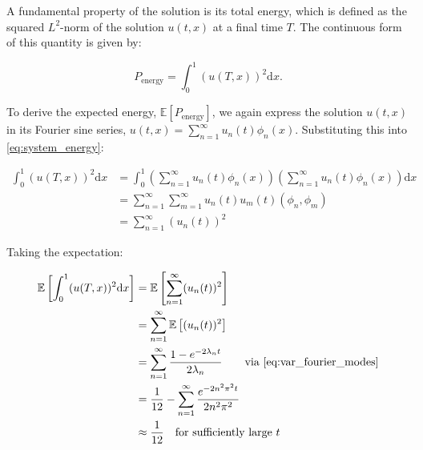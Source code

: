 A fundamental property of the solution is its total energy, which is defined 
as the squared $L^2$-norm of the solution $u(t,x)$ at a final time $T$. The 
continuous form of this quantity is given by:

\begin{equation}\label{eq:system_energy}
P_{\text{energy}} = \int_0^1 (u(T,x))^2 \mathrm{d}x.
\end{equation}

To derive the expected energy, $\mathbb{E}[P_{\text{energy}}]$, 
we again express the solution 
$u(t,x)$ in its Fourier sine series,
$u(t,x) = \sum_{n=1}^\infty u_n(t)\phi_n(x)$. Substituting this into 
\eqref{eq:system_energy}:

\begin{align*}
    \int_0^1 (u(T,x))^2 \mathrm{d}x &= 
    \int_0^1\left(\sum_{n=1}^\infty u_n(t)\phi_n(x)\right)
    \left(\sum_{n=1}^\infty u_n(t)\phi_n(x)\right) \mathrm{d}x \\
    &= \sum_{n=1}^\infty \sum_{m=1}^\infty u_n(t) u_m(t) (\phi_n, \phi_m) \\
    &= \sum_{n=1}^\infty (u_n(t))^2
\end{align*}

Taking the expectation:

\begin{align}
    \mathbb{E}\left[\int_0^1 (u(T,x))^2 \mathrm{d}x\right] &= 
    \mathbb{E}\left[\sum_{n=1}^\infty (u_n(t))^2\right] 
    \label{eq:parseval}
    \\
    &= \sum_{n=1}^\infty \mathbb{E}\left[(u_n(t))^2\right] 
    \nonumber
    \\
    &= \sum_{n=1}^\infty \frac{1-e^{-2\lambda_n t}}{2\lambda_n}
    \qquad \text{via } \eqref{eq:var_fourier_modes}
    \nonumber
    \\
    &= \frac{1}{12} - \sum_{n=1}^\infty \frac{e^{-2n^2 \pi^2 t}}{2 n^2 \pi^2}
    \nonumber
    \\
    &\approx \frac{1}{12} \quad \text{for sufficiently large } t
    \label{eq:she_energy_analytic_soln}
\end{align}
